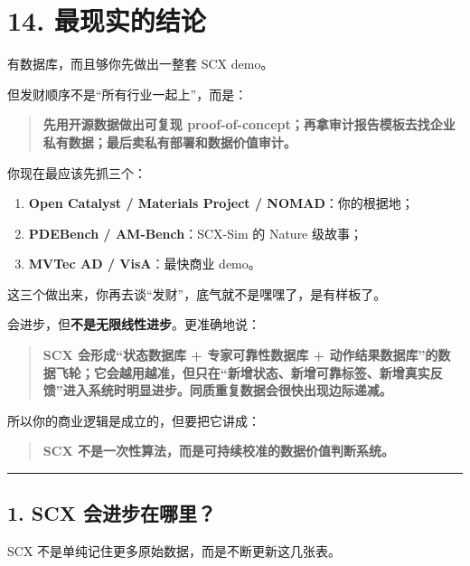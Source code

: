 \documentclass[
  12pt,
]{ctexart}
\providecommand{\tightlist}{%
  \setlength{\itemsep}{0pt}\setlength{\parskip}{0pt}}
\begin{document}
\section{14. 最现实的结论}\label{ux6700ux73b0ux5b9eux7684ux7ed3ux8bba}

有数据库，而且够你先做出一整套 SCX demo。

但发财顺序不是``所有行业一起上''，而是：

\begin{quote}
\textbf{先用开源数据做出可复现
proof-of-concept；再拿审计报告模板去找企业私有数据；最后卖私有部署和数据价值审计。}
\end{quote}

你现在最应该先抓三个：

\begin{enumerate}
\def\labelenumi{\arabic{enumi}.}
\tightlist
\item
  \textbf{Open Catalyst / Materials Project / NOMAD}：你的根据地；
\item
  \textbf{PDEBench / AM-Bench}：SCX-Sim 的 Nature 级故事；
\item
  \textbf{MVTec AD / VisA}：最快商业 demo。
\end{enumerate}

这三个做出来，你再去谈``发财''，底气就不是嘿嘿了，是有样板了。

会进步，但\textbf{不是无限线性进步}。更准确地说：

\begin{quote}
\textbf{SCX 会形成``状态数据库 + 专家可靠性数据库 +
动作结果数据库''的数据飞轮；它会越用越准，但只在``新增状态、新增可靠标签、新增真实反馈''进入系统时明显进步。同质重复数据会很快出现边际递减。}
\end{quote}

所以你的商业逻辑是成立的，但要把它讲成：

\begin{quote}
\textbf{SCX 不是一次性算法，而是可持续校准的数据价值判断系统。}
\end{quote}

\begin{center}\rule{0.5\linewidth}{0.5pt}\end{center}

\subsection{1. SCX
会进步在哪里？}\label{scx-ux4f1aux8fdbux6b65ux5728ux54eaux91cc}

SCX 不是单纯记住更多原始数据，而是不断更新这几张表。
\end{document}
